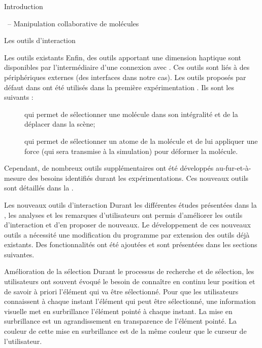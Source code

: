 \documentclass[myfrancais]{mythesis}
\begin{document}
\begin{mypart}{Introduction}
\begin{mychapter}{\myShaddock\ -- Manipulation collaborative de molécules}
\begin{mysection}{Les outils d'interaction}
\begin{mysubsection}{Les outils existants}
					Enfin, des outils apportant une dimension haptique sont disponibles par l'intermédiaire d'une connexion avec  .
					Ces outils sont liés à des périphériques externes (des interfaces \myOmni dans notre cas).
					Les outils proposés par défaut dans  ont été utilisés dans la première expérimentation .
					Ils sont les suivants :
					\begin{description}
						\item[] qui permet de sélectionner une molécule dans son intégralité et de la déplacer dans la scène;
						\item[] qui permet de sélectionner un atome de la molécule et de lui appliquer une force (qui sera transmise à la simulation) pour déformer la molécule.
					\end{description}

					Cependant, de nombreux outils supplémentaires ont été développés au-fur-et-à-mesure des besoins identifiés durant les expérimentations.
					Ces nouveaux outils sont détaillés dans la .
				\end{mysubsection}
				\begin{mysubsection}{Les nouveaux outils d'interaction}
					Durant les différentes études présentées dans la , les analyses et les remarques d'utilisateurs ont permis d'améliorer les outils d'interaction et d'en proposer de nouveaux.
					Le développement de ces nouveaux outils a nécessité une modification du programme  par extension des outils déjà existants.
					Des fonctionnalités ont été ajoutées et sont présentées dans les sections suivantes.
					\begin{mysubsubsection}{Amélioration de la sélection}
						Durant le processus de recherche et de sélection, les utilisateurs ont souvent évoqué le besoin de connaître en continu leur position et de savoir à priori l'élément qui va être sélectionné.
						Pour que les utilisateurs connaissent à chaque instant l'élément qui peut être sélectionné, une information visuelle met en surbrillance l'élément pointé à chaque instant.
						La mise en surbrillance est un agrandissement en transparence de l'élément pointé.
						La couleur de cette mise en surbrillance est de la même couleur que le curseur de l'utilisateur.


\end{mysubsubsection}
\end{mysubsection}
\end{mysection}
\end{mychapter}
\end{mypart}
\end{document}
